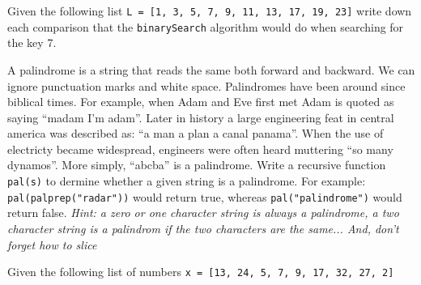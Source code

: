 \documentclass[11pt]{exam}
\begin{document}
\begin{questions}
\question[10] Given the following list \lstinline{L = [1, 3, 5, 7, 9, 11, 13, 17, 19, 23]} write down each comparison that the \texttt{binarySearch} algorithm would do when searching for the key 7.
\vspace{4in}

\question[10]
A palindrome is a string that reads the same both forward and
backward. We can ignore punctuation marks and white space. Palindromes have been
 around since biblical times. For example, when Adam and Eve first met Adam is quoted as saying ``madam I'm adam''. Later in history a large engineering feat in central america was described as:
``a man a plan a canal panama''. When the use of electricty became widespread,
engineers were often heard muttering ``so many dynamos''.   More simply, ``abcba'' is a palindrome.  Write a recursive
function \texttt{pal(s)} to dermine whether a given string is a
palindrome. For example: \texttt{pal(palprep("radar"))}
would return true, whereas \texttt{pal("palindrome")} would return false. \textit{Hint: a zero or one character string is always a palindrome, a two character string is a palindrom if the two characters are the same... And, don't forget how to slice}

\newpage
\question Given the following list of numbers \lstinline{x = [13, 24, 5, 7, 9, 17, 32, 27, 2]}

\end{questions}
\end{document}
